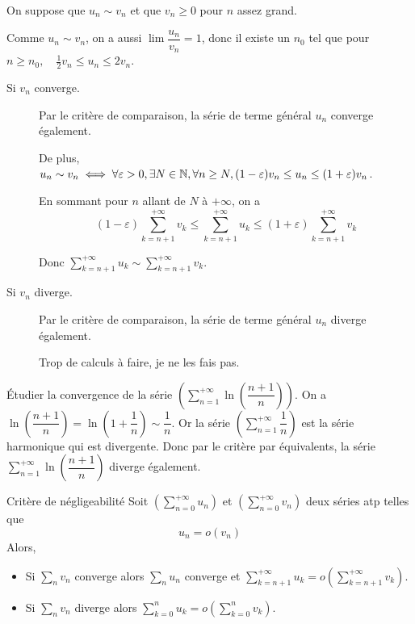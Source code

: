 \documentclass[a4paper, 12pt]{article}
\begin{document}
\begin{demonstration}
    On suppose que $u_n \sim v_n$ et que $v_n \geq 0$ pour $n$ assez grand.

    Comme $u_n \sim v_n$, on a aussi $\lim \dfrac{u_n}{v_n} = 1$,
    donc il existe un $n_0$ tel que pour $n \geq n_0, \quad \frac{1}{2} v_n \leq u_n \leq 2 v_n$.

    \begin{description}
        \item[Si $v_n$ converge.]
        Par le critère de comparaison, la série de terme général $u_n$ converge également.

        De plus, $u_n \sim v_n \iff \forall \varepsilon > 0, \exists N \in \mathbb{N}, \forall n \geq N, (1 - \varepsilon) v_n \leq u_n \leq (1 + \varepsilon) v_n$.

        En sommant pour $n$ allant de $N$ à $+\infty$, on a
        $$
        (1 - \varepsilon) \sum\limits_{k=n+1}^{+\infty} v_k \leq \sum\limits_{k=n+1}^{+\infty} u_k \leq (1 + \varepsilon) \sum\limits_{k=n+1}^{+\infty} v_k
        $$

        Donc $\sum\limits_{k=n+1}^{+\infty} u_k \sim \sum\limits_{k=n+1}^{+\infty} v_k$.
        
        \item[Si $v_n$ diverge.]
        Par le critère de comparaison, la série de terme général $u_n$ diverge également.
        \begin{hotwarn}
            Trop de calculs à faire, je ne les fais pas.
        \end{hotwarn}
    \end{description}
\end{demonstration}

\begin{exemple}
    Étudier la convergence de la série $\left( \sum\limits_{n=1}^{+\infty} \ln\left( \dfrac{n+1}{n} \right) \right)$.
    \newline
    On a $\ln\left( \dfrac{n+1}{n} \right) = \ln\left( 1 + \dfrac{1}{n} \right) \sim \dfrac{1}{n}$.
    Or la série $\left(\sum\limits_{n=1}^{+\infty} \dfrac{1}{n}\right)$ est la série harmonique qui est divergente.
    Donc par le critère par équivalents, la série $\sum\limits_{n=1}^{+\infty} \ln\left( \dfrac{n+1}{n} \right)$ diverge également.
\end{exemple}

\begin{theoreme}{Critère de négligeabilité}{}
    Soit $\left( \sum\limits_{n=0}^{+\infty} u_n \right)$ et $\left( \sum\limits_{n=0}^{+\infty} v_n \right)$ deux séries atp telles que
    $$
    u_n = o(v_n)
    $$
    Alors,

    \begin{itemize}
        \item Si $\sum\limits_n v_n$ converge alors $\sum\limits_{n} u_n$ converge et $\sum\limits_{k = n + 1}^{+\infty} u_k = o\left( \sum\limits_{k = n + 1}^{+\infty} v_k \right)$.
        \item Si $\sum\limits_n v_n$ diverge alors $\sum\limits_{k=0}^{n} u_k = o\left( \sum\limits_{k=0}^{n} v_k \right)$.
    \end{itemize}
\end{theoreme}
\end{document}
